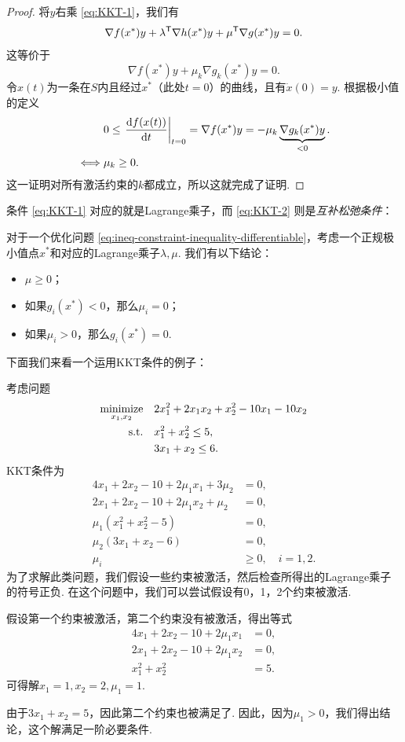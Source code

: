 \begin{proof}
将$y$右乘 \eqref{eq:KKT-1}，我们有
\[\nabla f(x^*)y+\lambda^{\mathsf{T}} \nabla h(x^*)y+\mu^{\mathsf{T}} \nabla g(x^*)y=0.\]
这等价于
\[\nabla f(x^*)y+\mu_k\nabla g_k(x^*)y=0.\]
令$x(t)$为一条在$S$内且经过$x^*$（此处$t=0$）的曲线，且有$\dot{x}(0)={y}$. 根据极小值的定义
\begin{align*}
    &0\leq \left.\frac{\mathrm{d} f(x(t))}{\mathrm{d} t}\right|_{t=0}=\nabla f(x^*)y=-\mu_k\underbrace{\nabla g_k(x^*)y}_{<0}.\\
    \iff&\mu_k\geq 0.
\end{align*}
这一证明对所有激活约束的$k$都成立，所以这就完成了证明. 
\end{proof}

条件 \eqref{eq:KKT-1} 对应的就是Lagrange乘子，而 \eqref{eq:KKT-2} 则是\emph{互补松弛条件}：

\begin{proposition}[互补松弛条件]
    对于一个优化问题 \eqref{eq:ineq-constraint-inequality-differentiable}，考虑一个正规极小值点$x^*$和对应的Lagrange乘子$\lambda,\mu$. 我们有以下结论：
    \begin{itemize}
        \item $\mu\geq 0$；
        \item 如果$g_i(x^*)<0$，那么$\mu_i=0$；
        \item 如果$\mu_i>0$，那么$g_i(x^*)=0$.
    \end{itemize}
\end{proposition}

下面我们来看一个运用KKT条件的例子：
\begin{example}
考虑问题
\begin{align*}
    \operatorname*{minimize}_{x_1,x_2} \quad &2x_1^2+2x_1x_2+x_2^2-10x_1-10x_2 \\
    \text{s.t.}\quad &x_1^2+x_2^2\leq 5, \\
    & 3x_1+x_2\leq 6.
\end{align*}
KKT条件为
\begin{align*}
    4x_1+2x_2-10+2\mu_1x_1+3\mu_2&=0, \\
    2x_1+2x_2-10+2\mu_1x_2+\mu_2&=0, \\
    \mu_1(x_1^2+x_2^2-5)&=0, \\
    \mu_2(3x_1+x_2-6)&=0,\\
    \mu_i&\geq 0,\quad i=1,2.
\end{align*}
为了求解此类问题，我们假设一些约束被激活，然后检查所得出的Lagrange乘子的符号正负. 在这个问题中，我们可以尝试假设有0，1，2个约束被激活. 

假设第一个约束被激活，第二个约束没有被激活，得出等式
\begin{align*}
4x_1+2x_2-10+2\mu_1x_1&=0, \\
2x_1+2x_2-10+2\mu_1x_2&=0, \\
x_1^2+x_2^2&=5.
\end{align*}
可得解$x_1=1,x_2=2,\mu_1=1.$

由于$3x_1+x_2=5$，因此第二个约束也被满足了. 因此，因为$\mu_1 > 0$，我们得出结论，这个解满足一阶必要条件. 
\end{example}


